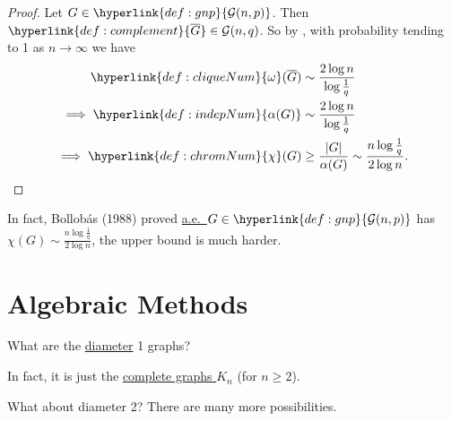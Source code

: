 \documentclass{article}
\begin{document}
\begin{proof}
    Let $G \in \hyperlink{def:gnp}{\mathcal{G}(n,p)}$. Then $\hyperlink{def:complement}{\overline{G}} \in \mathcal{G}(n,q)$.
    So by , with probability tending to 1 as $n \to \infty$ we have
    \begin{align*}
        \hyperlink{def:cliqueNum}{\omega}(\overline{G}) &\sim \frac{2 \log n}{\log \frac{1}{q}} \\
        \implies \hyperlink{def:indepNum}{\alpha(G)} &\sim \frac{2 \log n}{\log \frac{1}{q}}\\
        \implies \hyperlink{def:chromNum}{\chi}(G) &\geq \frac{|G|}{\alpha(G)} \sim \frac{n \log \frac{1}{q}}{2 \log n}. \qedhere
    \end{align*}
\end{proof}

In fact, Bollob\'as (1988) proved \hyperlink{def:ae}{a.e.\ }$G \in \hyperlink{def:gnp}{\mathcal{G}(n,p)}$ has $\chi(G) \sim \frac{n \log \frac{1}{q}}{2 \log n}$, the upper bound is much harder.

\clearpage
\section{Algebraic Methods}

\begin{eg}
    What are the \hyperlink{def:diameter}{diameter} 1 graphs?
    \begin{center}
    \end{center}
    In fact, it is just the \hyperlink{def:Kn}{complete graphs $K_n$} (for $n \geq 2$).

    What about diameter 2? There are many more possibilities.
\end{eg}
\end{document}
